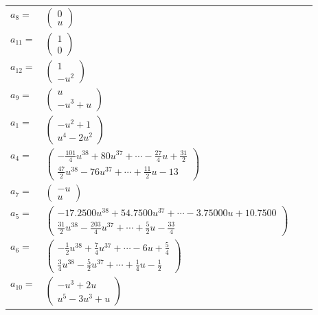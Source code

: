 \documentclass[1p]{elsarticle_modified}
\theoremstyle{definition}
\begin{document}
\begin{tabular}{m{7pt} m{180pt} m{7pt} m{180pt} }
\flushright $a_{8}=$&$\begin{pmatrix}0\\u\end{pmatrix}$ \\
\flushright $a_{11}=$&$\begin{pmatrix}1\\0\end{pmatrix}$ \\
\flushright $a_{12}=$&$\begin{pmatrix}1\\- u^2\end{pmatrix}$ \\
\flushright $a_{9}=$&$\begin{pmatrix}u\\- u^3+u\end{pmatrix}$ \\
\flushright $a_{1}=$&$\begin{pmatrix}- u^2+1\\u^4-2 u^2\end{pmatrix}$ \\
\flushright $a_{4}=$&$\begin{pmatrix}-\frac{101}{4} u^{38}+80 u^{37}+\cdots-\frac{27}{4} u+\frac{31}{2}\\\frac{47}{2} u^{38}-76 u^{37}+\cdots+\frac{11}{2} u-13\end{pmatrix}$ \\
\flushright $a_{7}=$&$\begin{pmatrix}- u\\u\end{pmatrix}$ \\
\flushright $a_{5}=$&$\begin{pmatrix}-17.2500 u^{38}+54.7500 u^{37}+\cdots-3.75000 u+10.7500\\\frac{31}{2} u^{38}-\frac{203}{4} u^{37}+\cdots+\frac{5}{2} u-\frac{33}{4}\end{pmatrix}$ \\
\flushright $a_{6}=$&$\begin{pmatrix}-\frac{1}{2} u^{38}+\frac{7}{4} u^{37}+\cdots-6 u+\frac{5}{4}\\\frac{3}{4} u^{38}-\frac{5}{2} u^{37}+\cdots+\frac{1}{4} u-\frac{1}{2}\end{pmatrix}$ \\
\flushright $a_{10}=$&$\begin{pmatrix}- u^3+2 u\\u^5-3 u^3+u\end{pmatrix}$ \\

\end{tabular}
\end{document}
